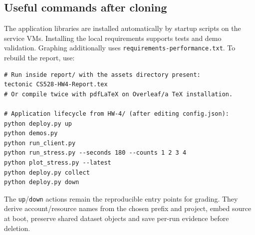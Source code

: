 \documentclass[11pt,letterpaper]{article}
\newcommand{\code}[1]{\texttt{\small #1}}
\begin{document}
\subsection*{Useful commands after cloning}
The application libraries are installed automatically by startup scripts on the service
VMs. Installing the local requirements supports tests and demo validation. Graphing
additionally uses \code{requirements-performance.txt}. To rebuild the report, use:
\begin{lstlisting}
# Run inside report/ with the assets directory present:
tectonic CS528-HW4-Report.tex
# Or compile twice with pdfLaTeX on Overleaf/a TeX installation.

# Application lifecycle from HW-4/ (after editing config.json):
python deploy.py up
python demos.py
python run_client.py
python run_stress.py --seconds 180 --counts 1 2 3 4
python plot_stress.py --latest
python deploy.py collect
python deploy.py down
\end{lstlisting}
The \code{up}/\code{down} actions remain the reproducible entry points for grading. They
derive account/resource names from the chosen prefix and project, embed source at boot,
preserve shared dataset objects and save per-run evidence before deletion.
\end{document}
